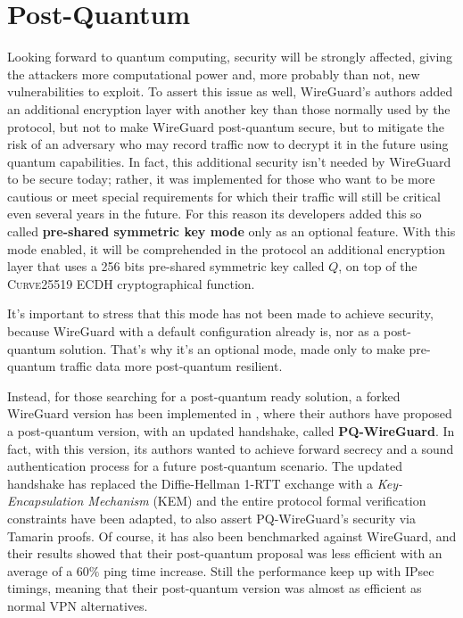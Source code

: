 \documentclass[light]{academica}
\begin{document}
\section{Post-Quantum}\label{sec:postquantum}

Looking forward to quantum computing, security will be strongly affected, giving the attackers more computational power and, more probably than not, new vulnerabilities to exploit.
To assert this issue as well, WireGuard's authors added an additional encryption layer with another key than those normally used by the protocol, but not to make WireGuard post-quantum secure, but to mitigate the risk of an adversary who may record traffic now to decrypt it in the future using quantum capabilities.
In fact, this additional security isn't needed by WireGuard to be secure today; rather, it was implemented for those who want to be more cautious or meet special requirements for which their traffic will still be critical even several years in the future.
For this reason its developers added this so called \textbf{pre-shared symmetric key mode} only as an optional feature.
With this mode enabled, it will be comprehended in the protocol an additional encryption layer that uses a 256 bits pre-shared symmetric key called $Q$, on top of the \textsc{Curve25519} ECDH cryptographical function.

It's important to stress that this mode has not been made to achieve security, because WireGuard with a default configuration already is, nor as a post-quantum solution.
That's why it's an optional mode, made only to make pre-quantum traffic data more post-quantum resilient.

Instead, for those searching for a post-quantum ready solution, a forked WireGuard version has been implemented in \cite{pq-wireguard}, where their authors have proposed a post-quantum version, with an updated handshake, called \textbf{PQ-WireGuard}.
In fact, with this version, its authors wanted to achieve forward secrecy and a sound authentication process for a future post-quantum scenario.
The updated handshake has replaced the Diffie-Hellman 1-RTT exchange with a \textit{Key-Encapsulation Mechanism} (KEM) and the entire protocol formal verification constraints have been adapted, to also assert PQ-WireGuard's security via Tamarin proofs.
Of course, it has also been benchmarked against WireGuard, and their results showed that their post-quantum proposal was less efficient with an average of a $60\%$ ping time increase.
Still the performance keep up with IPsec timings, meaning that their post-quantum version was almost as efficient as normal VPN alternatives.
\end{document}
